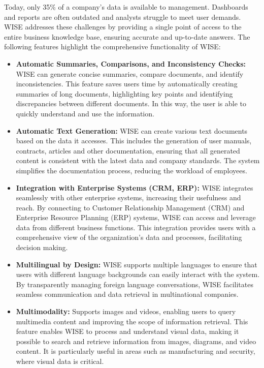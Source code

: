 Today, only 35\% of a company's data is available to management. Dashboards and reports are often outdated and analysts struggle to meet user demands. WISE addresses these challenges by providing a single point of access to the entire business knowledge base, ensuring accurate and up-to-date answers. The following features highlight the comprehensive functionality of WISE:

\begin{itemize}
    \item \textbf{Automatic Summaries, Comparisons, and Inconsistency Checks:} WISE can generate concise summaries, compare documents, and identify inconsistencies. This feature saves users time by automatically creating summaries of long documents, highlighting key points and identifying discrepancies between different documents. In this way, the user is able to quickly understand and use the information.
    
    \item \textbf{Automatic Text Generation:} WISE can create various text documents based on the data it accesses. This includes the generation of user manuals, contracts, articles and other documentation, ensuring that all generated content is consistent with the latest data and company standards. The system simplifies the documentation process, reducing the workload of employees.
    
    \item \textbf{Integration with Enterprise Systems (CRM, ERP):} WISE integrates seamlessly with other enterprise systems, increasing their usefulness and reach. By connecting to Customer Relationship Management (CRM) and Enterprise Resource Planning (ERP) systems, WISE can access and leverage data from different business functions. This integration provides users with a comprehensive view of the organization's data and processes, facilitating decision making.
    
    \item \textbf{Multilingual by Design:} WISE supports multiple languages to ensure that users with different language backgrounds can easily interact with the system. By transparently managing foreign language conversations, WISE facilitates seamless communication and data retrieval in multinational companies.
    
    \item \textbf{Multimodality:} Supports images and videos, enabling users to query multimedia content and improving the scope of information retrieval. This feature enables WISE to process and understand visual data, making it possible to search and retrieve information from images, diagrams, and video content. It is particularly useful in areas such as manufacturing and security, where visual data is critical.
    

\end{itemize}
